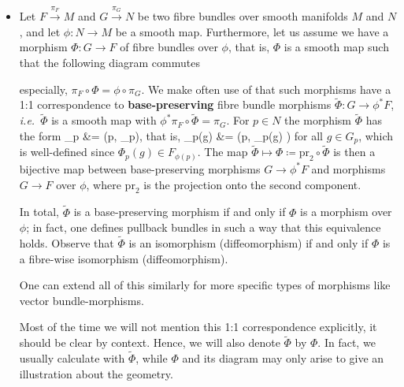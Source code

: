 \documentclass[a4paper,oneside,11pt,bibliography=totoc]{scrartcl}
\def\ba#1\ea{\begin{align}#1\end{align}}
\def\bas#1\eas{\begin{align*}#1\end{align*}}
\theoremstyle{plain}
\theoremstyle{remark}
\theoremstyle{definition}
\begin{document}
\begin{itemize}
	\item Let $F \stackrel{\pi_F}{\to} M$ and $G \stackrel{\pi_G}{\to} N$ be two fibre bundles over smooth manifolds $M$ and $N$, and let $\phi: N \to M$ be a smooth map. Furthermore, let us assume we have a morphism $\Phi: G \to F$ of fibre bundles over $\phi$, that is, $\Phi$ is a smooth map such that the following diagram commutes
	\begin{center}
	\end{center}
especially, $\pi_F \circ \Phi = \phi \circ \pi_G$.
We make often use of that such morphisms have a 1:1 correspondence to \textbf{base-preserving} fibre bundle morphisms $\widetilde{\Phi}: G \to \phi^*F$, \textit{i.e.}\ $\widetilde{\Phi}$ is a smooth map with $\phi^*\pi_F \circ \widetilde{\Phi} = \pi_G$. For $p \in N$ the morphism $\widetilde{\Phi}$ has the form
\bas
\widetilde{\Phi}_p
&=
(p, \Phi_p),
\eas
that is,
\bas
\widetilde{\Phi}_p(g)
&=
\bigl(p, \Phi_p(g) \bigr)
\eas
for all $g \in G_p$, which is well-defined since $\Phi_p(g) \in F_{\phi(p)}$. The map $\widetilde{\Phi} \mapsto \Phi \coloneqq \mathrm{pr}_2 \circ \widetilde{\Phi}$ is then a bijective map between base-preserving morphisms $G \to \phi^*F$ and morphisms $G \to F$ over $\phi$, where $\mathrm{pr}_2$ is the projection onto the second component. 

In total, $\widetilde{\Phi}$ is a base-preserving morphism if and only if $\Phi$ is a morphism over $\phi$; in fact, one defines pullback bundles in such a way that this equivalence holds. Observe that $\widetilde{\Phi}$ is an isomorphism (diffeomorphism) if and only if $\Phi$ is a fibre-wise isomorphism (diffeomorphism).

One can extend all of this similarly for more specific types of morphisms like vector bundle-morphisms.

Most of the time we will not mention this 1:1 correspondence explicitly, it should be clear by context. Hence, we will also denote $\widetilde{\Phi}$ by $\Phi$. In fact, we usually calculate with $\widetilde{\Phi}$, while $\Phi$ and its diagram may only arise to give an illustration about the geometry.


\end{itemize}
\end{document}
